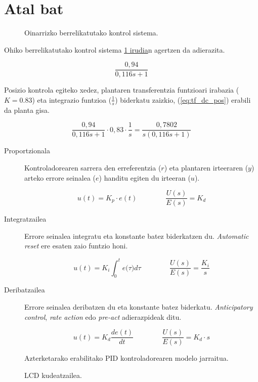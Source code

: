 %

\section{Atal bat}

\begin{figure}[!htp]
\centering

\caption{Oinarrizko berrelikatutako kontrol sistema.}
\label{fig:mod_closedloop}
\end{figure}

Ohiko berrelikatutako kontrol sistema \hyperref[fig:mod_closedloop]{\ref*{fig:mod_closedloop} irudia}n agertzen da adierazita.

\begin{equation}
\dfrac{0,94}{0,116 s + 1}
\label{eq:tf_dc}
\end{equation}

Posizio kontrola egiteko xedez, plantaren transferentzia funtzioari irabazia ($K=0.83$) eta integrazio funtzioa ($\frac{1}{s}$) biderkatu zaizkio, (\ref{eq:tf_dc_pos}) erabili da planta gisa.

\begin{equation}
\dfrac{0,94}{0,116 s + 1} \cdot {0,83} \cdot \dfrac{1}{s} = \dfrac{0,7802}{s (0,116 s + 1)}
\label{eq:tf_dc_pos}
\end{equation}

\begin{description}
\item[Proportzionala]{\hfill

Kontroladorearen sarrera den erreferentzia ($r$) eta plantaren irteeraren ($y$) arteko errore seinalea ($e$) handitu egiten du irteeran ($u$).

\[
u(t)=K_p \cdot e(t) \qquad \qquad \frac{U(s)}{E(s)}=K_d
\]}
\item[Integratzailea]{\hfill

Errore seinalea integratu eta konstante batez biderkatzen du. \emph{Automatic reset} ere esaten zaio funtzio honi.

\[
u(t)=K_i \int^t_0{e(\tau}){d\tau} \qquad \qquad \frac{U(s)}{E(s)}=\frac{K_i}{s}
\]}
\item[Deribatzailea]{\hfill

Errore seinalea deribatzen du eta konstante batez biderkatu. \emph{Anticipatory control}, \emph{rate action} edo \emph{pre-act} adierazpideak ditu.

\[
u(t)=K_d \frac{de(t)}{dt} \qquad \qquad \frac{U(s)}{E(s)}=K_d \cdot s
\]}
\end{description}

\begin{figure}[!htp]
\centering

\caption[Modeloa: jarraitua (kontroladorea)]{Azterketarako erabilitako PID kontroladorearen modelo jarraitua.}
\label{fig:mod_cont_lum}
\end{figure}

\begin{figure}[!htp]
\centering

\caption{LCD kudeatzailea.}
\label{fig:lcd}
\end{figure}